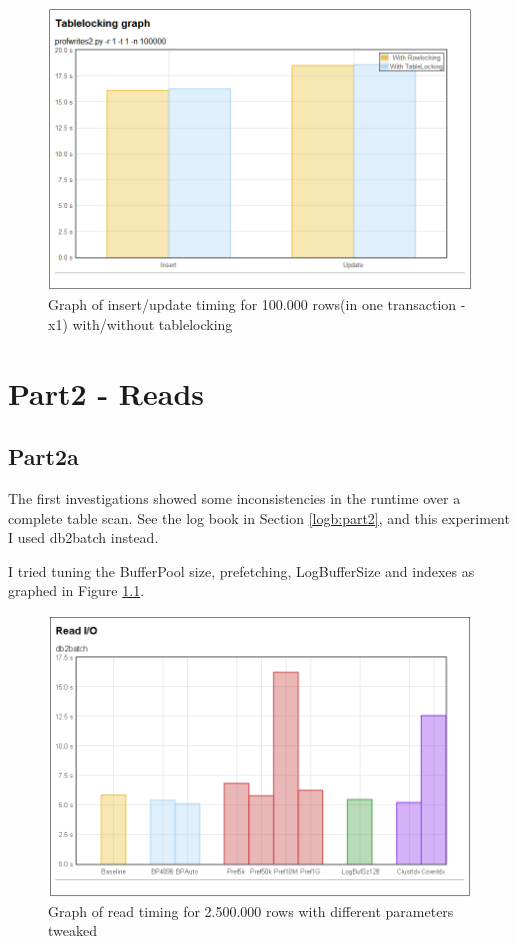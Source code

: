 \begin{figure}
  \centering
  \includegraphics[width=12cm]{assignment2/tl}
  \caption[Insert/update performance -Table locking]{Graph of insert/update timing for 100.000 rows(in one
  transaction -x1) with/without tablelocking}\label{fig:part1btl}
\end{figure}

\chapter{Part2 - Reads}

\section{Part2a}
The first investigations showed some inconsistencies in the runtime over a
complete table scan. See the log book in Section \ref{logb:part2}, and this
experiment I used db2batch instead.

I tried tuning the BufferPool size, prefetching, LogBufferSize and indexes as
graphed in Figure \ref{fig:readio}.

\begin{figure}
  \centering
  \includegraphics[width=12cm]{assignment2/readio}
  \caption[Read performance - Table locking]{Graph of read timing for 2.500.000
  rows with different parameters tweaked}\label{fig:readio}
\end{figure}

